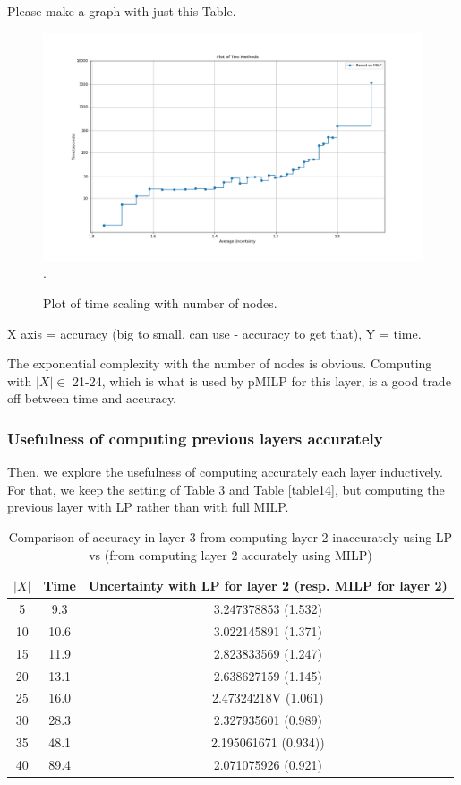 Please make a graph with just this Table. 

		\begin{figure}[h]\hspace*{-0.8cm}
	\includegraphics[scale=0.4]{Layer3_comparison}.
	\caption{Plot of time scaling with number of nodes.}
	\label{fig4}
\end{figure}




X axis = accuracy (big to small, can use - accuracy to get that), Y = time.

The exponential complexity with the number of nodes is obvious. 
Computing with $|X| \in$ 21-24, which is what is used by pMILP for this layer, is a good trade off between time and accuracy.

\subsubsection*{Usefulness of computing previous layers accurately}	

Then, we explore the usefulness of computing accurately each layer inductively.
For that, we keep the setting of Table 3 and Table \ref{table14}, but computing the previous layer with LP rather than with full MILP.


\begin{table}[h!]
	\centering
	\begin{tabular}{|c|c|c|}
		\hline
		$|X|$ & Time &  Uncertainty with LP for layer 2 (resp. MILP for layer 2)\\ 
		\hline	5 & 9.3 & 3.247378853 (1.532)\\
		\hline	10 & 10.6 & 3.022145891 (1.371)\\
		\hline	15 & 11.9 & 2.823833569 (1.247)\\
		\hline	20 & 13.1 & 2.638627159 (1.145)\\
		\hline	25 & 16.0 & 2.47324218V (1.061)\\
		\hline	30 & 28.3 & 2.327935601 (0.989)\\
		\hline	35 & 48.1 & 2.195061671 (0.934))\\
		\hline	40 & 89.4 & 2.071075926 (0.921)\\	
		\hline

	\end{tabular}
	\caption{Comparison of accuracy in layer 3 from computing layer 2 inaccurately using LP vs (from computing layer 2 accurately using MILP)}
	\label{table15}
\end{table}
	
